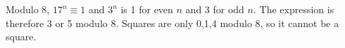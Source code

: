 Modulo 8, $17^n\equiv1$ and $3^n$ is 1 for even $n$ and 3 for odd $n$. The expression is therefore 3 or 5 modulo 8. Squares are only 0,1,4 modulo 8, so it cannot be a square.
